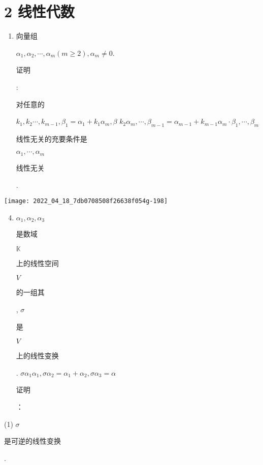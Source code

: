 \documentclass[10pt]{article}
\begin{document}
\section{2 线性代数}
\begin{enumerate}
  \item \begin{CJK}{UTF8}{mj}向量组\end{CJK} $\alpha_{1}, \alpha_{2}, \cdots, \alpha_{m}(m \geq 2), \alpha_{m} \neq 0$. \begin{CJK}{UTF8}{mj}证明\end{CJK}: \begin{CJK}{UTF8}{mj}对任意的\end{CJK} $k_{1}, k_{2} \cdots, k_{m-1}, \beta_{1}=\alpha_{1}+k_{1} \alpha_{m}, \beta$ $k_{2} \alpha_{m}, \cdots, \beta_{m-1}=\alpha_{m-1}+k_{m-1} \alpha_{m} \cdot \beta_{1}, \cdots, \beta_{m}$ \begin{CJK}{UTF8}{mj}线性无关的充要条件是\end{CJK} $\alpha_{1}, \cdots, \alpha_{m}$ \begin{CJK}{UTF8}{mj}线性无关\end{CJK}.
\end{enumerate}
\texttt{[image: 2022\_04\_18\_7db0708508f26638f054g-198]}

\begin{enumerate}
  \setcounter{enumi}{3}
  \item $\alpha_{1}, \alpha_{2}, \alpha_{3}$ \begin{CJK}{UTF8}{mj}是数域\end{CJK} $\mathbb{K}$ \begin{CJK}{UTF8}{mj}上的线性空间\end{CJK} $V$ \begin{CJK}{UTF8}{mj}的一组其\end{CJK}, $\sigma$ \begin{CJK}{UTF8}{mj}是\end{CJK} $V$ \begin{CJK}{UTF8}{mj}上的线性变换\end{CJK}. $\sigma \alpha_{1} \alpha_{1}, \sigma \alpha_{2}=\alpha_{1}+\alpha_{2}, \sigma \alpha_{3}=\alpha$ \begin{CJK}{UTF8}{mj}证明\end{CJK}：
\end{enumerate}
(1) $\sigma$ \begin{CJK}{UTF8}{mj}是可逆的线性变换\end{CJK}.
\end{document}
